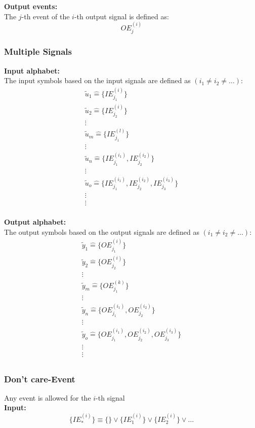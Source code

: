 \documentclass[10pt,a4paper]{article}
\begin{document}
\textbf{Output events:} ~\\
The $j$-th event of the $i$-th output signal is defined as:
$$
	OE^{(i)}_j
$$

\subsubsection{Multiple Signals}
\textbf{Input alphabet:} ~\\
The input symbols based on the input signals are defined as $(i_1 \not = i_2 \not = \dots)$:
$$
	\begin{array}{c}
		\tilde u_1 \hat = \{IE_{j_1}^{(i)}\} \\
		\tilde u_2 \hat = \{IE_{j_2}^{(i)}\} \\
		\vdots \\
		\tilde u_m \hat = \{IE_{j_1}^{(l)}\} \\
		\vdots \\
		\tilde u_n \hat = \{IE_{j_1}^{(i_1)}, IE_{j_2}^{(i_2)}\} \\
		\vdots \\
		\tilde u_o \hat = \{IE_{j_1}^{(i_1)}, IE_{j_2}^{(i_2)}, IE_{j_3}^{(i_3)}\} \\
		\vdots \\
		\vdots \\
	\end{array}
$$

\textbf{Output alphabet:} ~\\
The output symbols based on the output signals are defined as $(i_1 \not = i_2 \not = \dots)$:
$$
	\begin{array}{c}
		\tilde y_1 \hat = \{OE_{j_1}^{(i)}\} \\
		\tilde y_2 \hat = \{OE_{j_2}^{(i)}\} \\
		\vdots \\
		\tilde y_m \hat = \{OE_{j_1}^{(k)}\} \\
		\vdots \\
		\tilde y_n \hat = \{OE_{j_1}^{(i_1)}, OE_{j_2}^{(i_2)}\} \\
		\vdots \\
		\tilde y_o \hat = \{OE_{j_1}^{(i_1)}, OE_{j_2}^{(i_2)}, OE_{j_3}^{(i_3)}\} \\
		\vdots \\
		\vdots \\
	\end{array}
$$

\subsubsection{Don't care-Event}
Any event is allowed for the $i$-th signal \\
\textbf{Input:}
$$
	\{IE^{(i)}_*\} ≡ \{\} \lor \{IE^{(i)}_1\} \lor \{IE^{(i)}_2\} \lor \dots
$$
\end{document}
